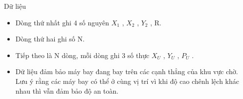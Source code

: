 Dữ liệu
\begin{itemize}
	\item     Dòng thứ nhất ghi 4 số nguyên $X_{1}$    , $X_{2}$    , $Y_{2}$    , R.   
	\item     Dòng thứ hai ghi số N.   
	\item     Tiếp theo là N dòng, mỗi dòng ghi 3 số thực $X_{U}$    , $Y_{U}$    , $P_{U}$    .   
	\item     Dữ liệu đảm bảo máy bay đang bay trên         các cạnh thẳng        của khu vực chờ. Lưu ý rằng các máy bay có thể ở cùng vị trí vì khi độ cao chênh lệch khác nhau thì vẫn đảm bảo độ an toàn.   
\end{itemize}